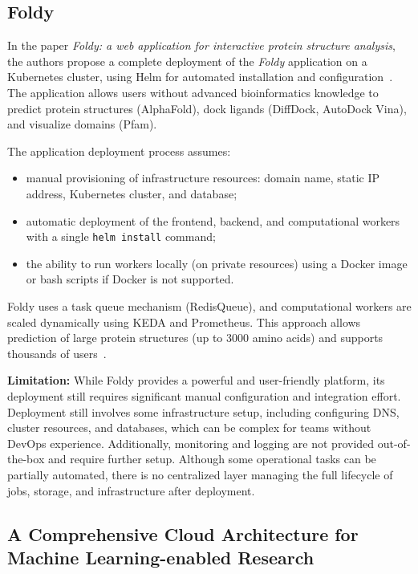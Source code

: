 \subsection{Foldy}

In the paper \textit{Foldy: a web application for interactive protein structure analysis}, the authors propose a complete deployment of the \textit{Foldy} application on a Kubernetes cluster, using Helm for automated installation and configuration~\cite{foldy,helm}.
The application allows users without advanced bioinformatics knowledge to predict protein structures (AlphaFold), dock ligands (DiffDock, AutoDock Vina), and visualize domains (Pfam).

The application deployment process assumes:
\begin{itemize}
    \item manual provisioning of infrastructure resources: domain name, static IP address, Kubernetes cluster, and database;
    \item automatic deployment of the frontend, backend, and computational workers with a single \texttt{helm install} command;
    \item the ability to run workers locally (on private resources) using a Docker image or bash scripts if Docker is not supported.
\end{itemize}

Foldy uses a task queue mechanism (RedisQueue), and computational workers are scaled dynamically using KEDA and Prometheus.
This approach allows prediction of large protein structures (up to 3000 amino acids) and supports thousands of users~\cite{foldy}.

\textbf{Limitation:} While Foldy provides a powerful and user-friendly platform, its deployment still requires significant manual configuration and integration effort.
Deployment still involves some infrastructure setup, including configuring DNS, cluster resources, and databases, which can be complex for teams without DevOps experience.
Additionally, monitoring and logging are not provided out-of-the-box and require further setup.
Although some operational tasks can be partially automated, there is no centralized layer managing the full lifecycle of jobs, storage, and infrastructure after deployment.

\subsection{A Comprehensive Cloud Architecture for Machine Learning-enabled Research}

